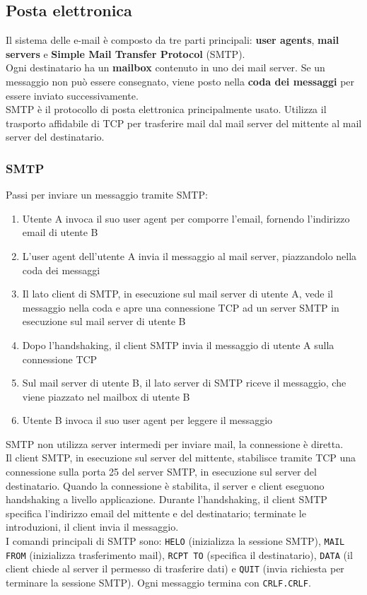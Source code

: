 \documentclass[11pt]{article}
\begin{document}
\subsection{Posta elettronica}
Il sistema delle e-mail è composto da tre parti principali: \textbf{user agents}, \textbf{mail servers} e 
\textbf{Simple Mail Transfer Protocol} (SMTP).\\
Ogni destinatario ha un \textbf{mailbox} contenuto in uno dei mail server. Se un messaggio non può essere consegnato, 
viene posto nella \textbf{coda dei messaggi} per essere inviato successivamente.\\
SMTP è il protocollo di posta elettronica principalmente usato. Utilizza il trasporto affidabile di TCP per trasferire
mail dal mail server del mittente al mail server del destinatario.
\subsubsection{SMTP}
Passi per inviare un messaggio tramite SMTP:
\begin{enumerate}
    \item Utente A invoca il suo user agent per comporre l'email, fornendo l'indirizzo email di utente B
    \item L'user agent dell'utente A invia il messaggio al mail server, piazzandolo nella coda dei messaggi
    \item Il lato client di SMTP, in esecuzione sul mail server di utente A, vede il messaggio nella coda e apre una
    connessione TCP ad un server SMTP in esecuzione sul mail server di utente B
    \item Dopo l'handshaking, il client SMTP invia il messaggio di utente A sulla connessione TCP
    \item Sul mail server di utente B, il lato server di SMTP riceve il messaggio, che viene piazzato nel mailbox di 
    utente B
    \item Utente B invoca il suo user agent per leggere il messaggio
\end{enumerate}
SMTP non utilizza server intermedi per inviare mail, la connessione è diretta.\\
Il client SMTP, in esecuzione sul server del mittente, stabilisce tramite TCP una connessione sulla porta 25 del server
SMTP, in esecuzione sul server del destinatario. Quando la connessione è stabilita, il server e client eseguono
handshaking a livello applicazione. Durante l'handshaking, il client SMTP specifica l'indirizzo email del mittente e del 
destinatario; terminate le introduzioni, il client invia il messaggio.\\
I comandi principali di SMTP sono: \texttt{HELO} (inizializza la sessione SMTP), \texttt{MAIL FROM} (inizializza 
trasferimento mail), \texttt{RCPT TO} (specifica il destinatario), \texttt{DATA} (il client chiede al server il 
permesso di trasferire dati) e \texttt{QUIT} (invia richiesta per terminare la sessione SMTP). Ogni messaggio termina 
con \texttt{CRLF.CRLF}.\\
\end{document}
